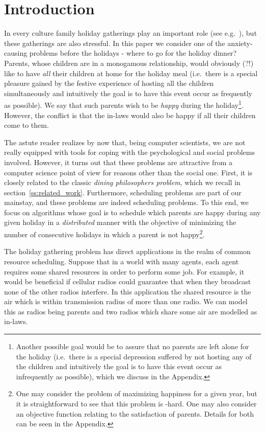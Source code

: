 \documentclass[11pt]{article}
\begin{document}
\setcounter{page}{0}
\newpage

\section{Introduction}\label{s:int}


In every culture family holiday gatherings play an
important role (see e.g.~\cite{nrg:09,tnn:10}), but these gatherings are also stressful.
In this paper we consider one of the anxiety-causing problems before
the holidays - where to go for the holiday dinner? Parents, whose
children are in a monogamous relationship, would obviously (?!) like
to have {\em all} their children at home for the holiday meal
(i.e.\ there is a special pleasure gained by the festive experience of
hosting all the children simultaneously and intuitively the goal is to
have this event occur as frequently as possible). We say that such
parents wish to be \emph{happy} during the holiday\footnote{Another possible goal would be to assure that no parents
are left alone for the holiday (i.e.\ there is a special depression
suffered by not hosting any of the children and intuitively the goal
is to have this event occur as infrequently as possible), which we discuss in the Appendix.}. However, the
conflict is that the in-laws would also be happy if all their children
come to them.


The astute reader realizes by now that, being computer
scientists, we are not really equipped with tools for coping with the
psychological and social problems involved. However, it turns out that
these problems are attractive from a computer science point of view
for reasons other than the social one. First, it is closely related to
the classic {\em dining philosophers problem}, which we recall in
section~\ref{ss:related_work}. Furthermore, scheduling problems are
part of our mainstay, and these problems are indeed scheduling
problems. To this end, we focus on algorithms whose goal is to
schedule which parents are happy during any given holiday in a {\em distributed} manner with the
objective of minimizing the number of consecutive holidays in which a
parent is not happy\footnote{One may consider the problem of
maximizing happiness for a given year, but it is straightforward to
see that this problem is -hard. One may also consider an
objective function relating to the satisfaction of parents. Details
for both can be seen in the Appendix.}.

The holiday gathering problem has direct applications in the realm of common resource scheduling. Suppose that in a world with many agents, each agent requires some shared resources in order to perform some job. For example, it would be beneficial if cellular radios could guarantee that when they broadcast none of the other radios interfere. In this application the shared resource is the air which is within transmission radius of more than one radio. We can model this as radios being parents and two radios which share some air are modelled as in-laws.
\end{document}
